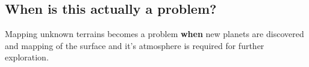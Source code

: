 \subsection{When is this actually a problem?}
Mapping unknown terrains becomes a problem \textbf{when} new planets are discovered and mapping of the surface and it's atmosphere is required for further exploration. 
